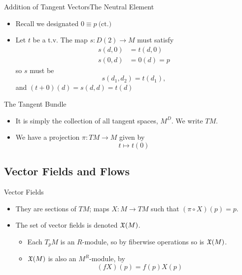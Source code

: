 \documentclass{beamer}
\begin{document}

\begin{frame}{Addition of Tangent Vectors}{The Neutral Element}
  \begin{itemize}
    \item Recall we designated \( 0\equiv p\ \text{(ct.)} \)
    \item Let \( t \) be a t.v. The map \( s:D(2)\to M \) must satisfy
      \begin{align*}
        s(d,0) &= t(d,0)\\
        s(0,d) &= 0(d) = p
      \end{align*}
      so \( s \) must be
      \begin{equation*}
        s(d_1,d_2) = t(d_1),
      \end{equation*}
      and \( (t + 0)(d) = s(d,d) = t(d) \)
  \end{itemize}
\end{frame}

\begin{frame}{The Tangent Bundle}
  \begin{itemize}
    \item It is simply the collection of all tangent spaces, \( M^D \). We write \( TM \).
    \item We have a projection \( \pi:TM\to M \) given by
      \begin{equation*}
        t\mapsto t(0)
      \end{equation*}
  \end{itemize}
\end{frame}

\subsection{Vector Fields and Flows}

\begin{frame}{Vector Fields}
  \begin{itemize}
    \item They are sections of \( TM \); maps \( X:M\to TM \) such that \( (\pi\circ X)(p) = p \).
    \item The set of vector fields is denoted \( \mathfrak X(M) \).
      \begin{itemize}
        \pause
        \item Each \( T_pM \) is an \( R \)-module, so by fiberwise operations so is \( \mathfrak X(M) \).
        \pause
        \item \( \mathfrak X(M) \) is also an \( M^R \)-module, by
          \begin{equation*}
            (fX)(p) = f(p)X(p)
          \end{equation*}
      \end{itemize}
  \end{itemize}
\end{frame}
\end{document}
